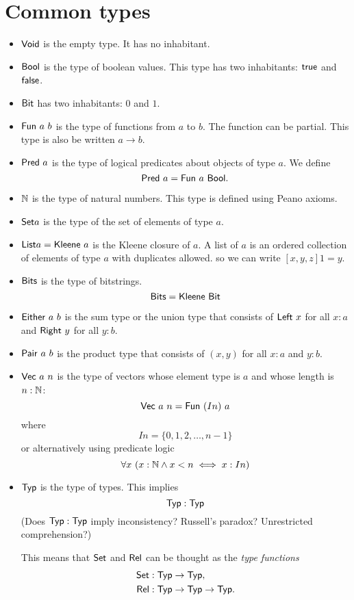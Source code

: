 \section{Common types}

\begin{itemize}
    \item
        $\mathsf{Void}$ is the empty type.
        It has no inhabitant.
    \item
        $\textsf{Bool}$ is the type of boolean values.
        This type has two inhabitants: $\textsf{true}$ and $\textsf{false}$.
    \item
        $\textsf{Bit}$ has two inhabitants: $0$ and $1$.
    \item
        $\mathsf{Fun}~a~b$ is the type of functions from $a$ to $b$.
        The function can be partial.
        This type is also be written $a \to b$.
    \item
        $\mathsf{Pred}~a$ is the type of
        logical predicates about objects of type $a$.
        We define
        \[ \mathsf{Pred}~a = \mathsf{Fun}~a~\textsf{Bool}. \]
    \item
        $\mathbb{N}$ is the type of natural numbers.
        This type is defined using Peano axioms.
    \item
        $\textsf{Set}{a}$ is the type of the set of elements of type $a$.
    \item $\textsf{List}{a} = \mathsf{Kleene}~a$ is the Kleene closure of $a$.
        A list of $a$ is an ordered collection of elements of type $a$ with duplicates allowed.
        so we can write $[x,y,z] 1 = y$.
    \item $\textsf{Bits}$ is the type of bitstrings.
        \[
            \textsf{Bits} = \mathsf{Kleene}~\textsf{Bit}
        \]
    \item $\mathsf{Either}~a~b$ is the sum type or the union type
        that consists of $\mathsf{Left}~x$ for all $x : a$
        and $\mathsf{Right}~y$ for all $y : b$.
    \item $\mathsf{Pair}~a~b$ is the product type
        that consists of $(x,y)$ for all $x : a$ and $y : b$.
    \item
        $\mathsf{Vec}~a~n$ is the type of vectors
        whose element type is $a$ and whose length is $n : \mathbb{N}$:
        \[ \mathsf{Vec}~a~n = \mathsf{Fun}~(I n)~a \]
        where
        \[ I n = \{ 0, 1, 2, \ldots, n - 1 \} \]
        or alternatively using predicate logic
        \[ \forall x~ (x : \mathbb{N} \wedge x < n \iff x : I n) \]
    \item $\mathsf{Typ}$ is the type of types.
        This implies
        \[ \mathsf{Typ} : \mathsf{Typ} \]
        (Does $\mathsf{Typ} : \mathsf{Typ}$ imply inconsistency?
        Russell's paradox?
        Unrestricted comprehension?)

        This means that $\mathsf{Set}$ and $\mathsf{Rel}$ can be thought as the \emph{type functions}
        \begin{align*}
            \mathsf{Set} &: \mathsf{Typ} \to \mathsf{Typ},
            \\
            \mathsf{Rel} &: \mathsf{Typ} \to \mathsf{Typ} \to \mathsf{Typ}.
        \end{align*}
\end{itemize}

